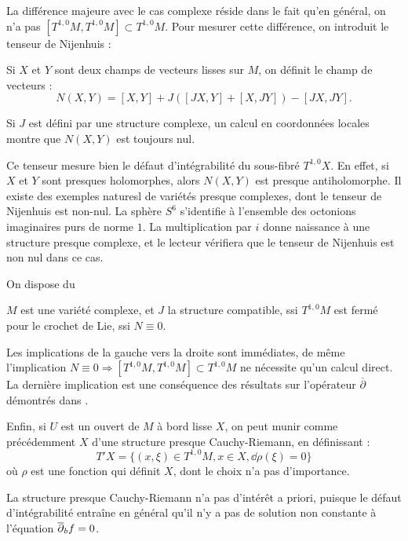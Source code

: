 La différence majeure avec le cas complexe réside dans le fait qu'en général, on n'a pas $[T^{1,0}M, T^{1,0}M]\subset T^{1,0}M$. Pour mesurer cette différence, on introduit le tenseur de Nijenhuis :

\begin{defn}
	Si $X$ et $Y$ sont deux champs de vecteurs lisses sur $M$, on définit le champ de vecteurs :
	\begin{equation*}
		N(X,Y)=[X,Y]+J([JX,Y] + [X,JY]) - [JX,JY].
	\end{equation*}
\end{defn}
Si $J$ est défini par une structure complexe, un calcul en coordonnées locales montre que $N(X,Y)$ est toujours nul.

Ce tenseur mesure bien le défaut d'intégrabilité du sous-fibré $T^{1,0}X$. En effet, si $X$ et $Y$ sont presques holomorphes, alors $N(X,Y)$ est presque antiholomorphe. Il existe des exemples naturesl de variétés presque complexes, dont le tenseur de Nijenhuis est non-nul. La sphère $S^6$ s'identifie à l'ensemble des octonions imaginaires purs de norme $1$. La multiplication par $i$ donne naissance à une structure presque complexe, et le lecteur vérifiera que le tenseur de Nijenhuis est non nul dans ce cas. 

On dispose du

\begin{theorem}
	$M$ est une variété complexe, et $J$ la structure compatible, ssi $T^{1,0}M$ est fermé pour le crochet de Lie, ssi $N \equiv 0$.
\end{theorem}
	Les implications de la gauche vers la droite sont immédiates, de même l'implication $N \equiv 0 \Rightarrow [T^{1,0}M,T^{1,0}M]\subset T^{1,0}M$ ne nécessite qu'un calcul direct. La dernière implication est une conséquence des résultats sur l'opérateur $\overline{\partial}$ démontrés dans \cite{kohn1963harmonic}.
	
	Enfin, si $U$ est un ouvert de $M$ à bord lisse $X$, on peut munir comme précédemment $X$ d'une structure presque Cauchy-Riemann, en définissant :
	\begin{equation*}
		T'X=\{(x,\xi)\in T^{1,0}M, x\in X, \dd \rho(\xi)=0 \}
	\end{equation*}
	où $\rho$ est une fonction qui définit $X$, dont le choix n'a pas d'importance.
	
	La structure presque Cauchy-Riemann n'a pas d'intérêt a priori, puisque le défaut d'intégrabilité entraîne en général qu'il n'y a pas de solution non constante à l'équation $\overline{\partial}_b f =0$.
	
